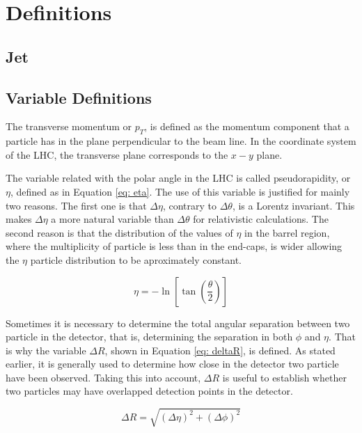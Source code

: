 \chapter{Definitions} \label{sec:definitions}

\section{Jet}

\cite{Jets}

\section{Variable Definitions}

The transverse momentum or $p_{T}$, is defined as the momentum component that a particle has in the plane perpendicular to the beam line. In the coordinate system of the LHC, the transverse plane corresponds to the $x-y$ plane.

The variable related with the polar angle in the LHC is called pseudorapidity, or $\eta$, defined as in Equation \ref{eq: eta}. The use of this variable is justified for mainly two reasons. The first one is that $\Delta \eta$, contrary to $\Delta \theta$, is a Lorentz invariant. This makes $\Delta \eta$ a more natural variable than $\Delta \theta$ for relativistic calculations. The second reason is that the distribution of the values of $\eta$ in the barrel region, where the multiplicity of particle is less than in the end-caps, is wider allowing the $\eta$ particle distribution to be aproximately constant.

\begin{equation}
 \eta = -\ln\left[\tan\left(\frac{\theta}{2}\right)\right]
 \label{eq: eta}
\end{equation}

Sometimes it is necessary to determine the total angular separation between two particle in the detector, that is, determining the separation in both $\phi$ and $\eta$. That is why the variable $\Delta R$, shown in Equation \ref{eq: deltaR}, is defined. As stated earlier, it is generally used to determine how close in the detector two particle have been observed. Taking this into account, $\Delta R$ is useful to establish whether two particles may have overlapped detection points in the detector. 

\begin{equation}\label{eq: deltaR}
\Delta R = \sqrt{\left(\Delta \eta\right)^{2} + \left(\Delta \phi \right)^{2}}
\end{equation}

